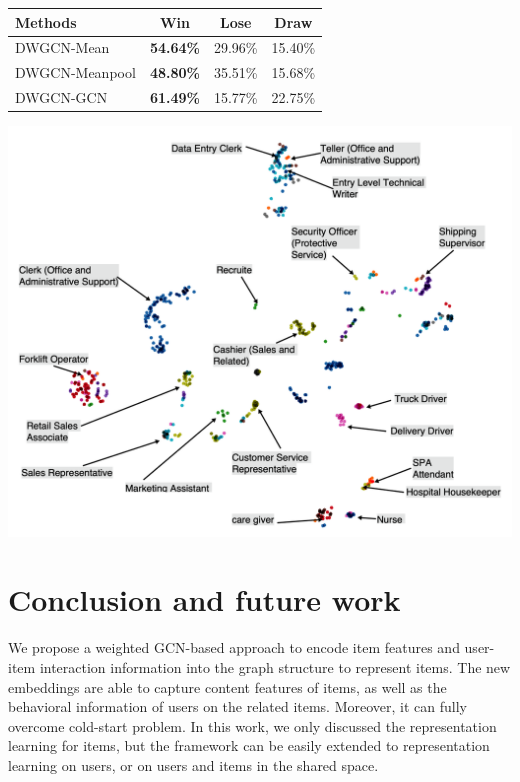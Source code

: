 \documentclass[manuscript,screen,review]{acmart}
\begin{document}
\vspace{0em}
   \begin{minipage}{\textwidth}
     \begin{minipage}[b]{0.45\textwidth}
    \centering
  \begin{tabular}[b]{lccc}
    \toprule
    Methods & Win & Lose & Draw \\
    \midrule
    DWGCN-Mean& \textbf{54.64\%} & 29.96\% & 15.40\%\\
    DWGCN-Meanpool& \textbf{48.80\%} & 35.51\% & 15.68\%\\
    DWGCN-GCN & \textbf{61.49\%} & 15.77\% & 22.75\%\\
  \bottomrule
\end{tabular}
      \label{tab:comp}
      \vspace{5em}
    \end{minipage}
    \hfill
  \begin{minipage}[b]{0.49\textwidth}
    \centering
    \includegraphics[width=\textwidth]{data_vis3.png}
    \label{fig:data_vis}
  \end{minipage}
  \end{minipage}
  \vspace{0em}
 
\section{Conclusion and future work}
We propose a weighted GCN-based approach to encode item features and user-item interaction information into the graph structure to represent items. The new embeddings are able to capture content features of items, as well as the behavioral information of users on the related items. Moreover, it can fully overcome cold-start problem. In this work, we only discussed the representation learning for items, but the framework can be easily extended to representation learning on users, or on users and items in the shared space. 
\end{document}
